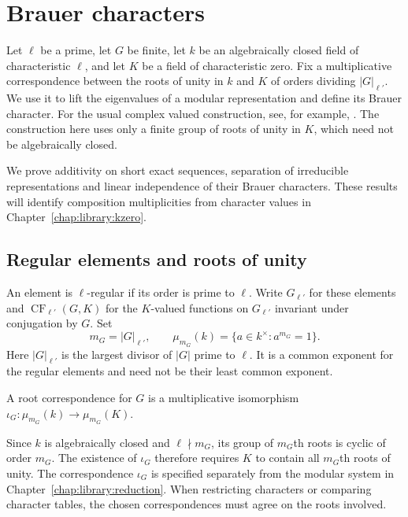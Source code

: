 \chapter{Brauer characters}
\label{chap:library:brauer}

Let $\ell$ be a prime, let $G$ be finite, let $k$ be an algebraically closed
field of characteristic $\ell$, and let $K$ be a field of characteristic
zero. Fix a multiplicative correspondence between the roots of unity in
$k$ and $K$ of orders dividing $|G|_{\ell'}$. We use it to lift the
eigenvalues of a modular representation and define its Brauer character.
For the usual complex valued construction, see, for example,
\cite[pp.~17--18]{Navarro1998}. The construction here uses only a finite
group of roots of unity in $K$, which need not be algebraically closed.

We prove additivity on short exact sequences, separation of irreducible
representations and linear independence of their Brauer characters.
These results will identify composition multiplicities from character
values in Chapter~\ref{chap:library:kzero}.

\section{Regular elements and roots of unity}
\label{lib:brauer:roots}

An element is $\ell$-regular if its order is prime to $\ell$. Write
$G_{\ell'}$ for these elements and
$\operatorname{CF}_{\ell'}(G,K)$ for the $K$-valued functions on
$G_{\ell'}$ invariant under conjugation by $G$. Set
\[
 m_G=|G|_{\ell'},\qquad
 \mu_{m_G}(k)=\{a\in k^\times:a^{m_G}=1\}.
\]
Here $|G|_{\ell'}$ is the largest divisor of $|G|$ prime to $\ell$.
It is a common exponent for the regular elements and need not be their
least common exponent.

\begin{definition}
\label{lib:brauer:root-correspondence}
A root correspondence for $G$ is a multiplicative isomorphism
$\iota_G:\mu_{m_G}(k)\to\mu_{m_G}(K)$.
\end{definition}

Since $k$ is algebraically closed and $\ell\nmid m_G$, its group of
$m_G$th roots is cyclic of order $m_G$. The existence of $\iota_G$
therefore requires $K$ to contain all $m_G$th roots of unity.
The correspondence $\iota_G$ is specified separately from the modular system in
Chapter~\ref{chap:library:reduction}. When restricting characters or
comparing character tables, the chosen correspondences must agree on the
roots involved.

